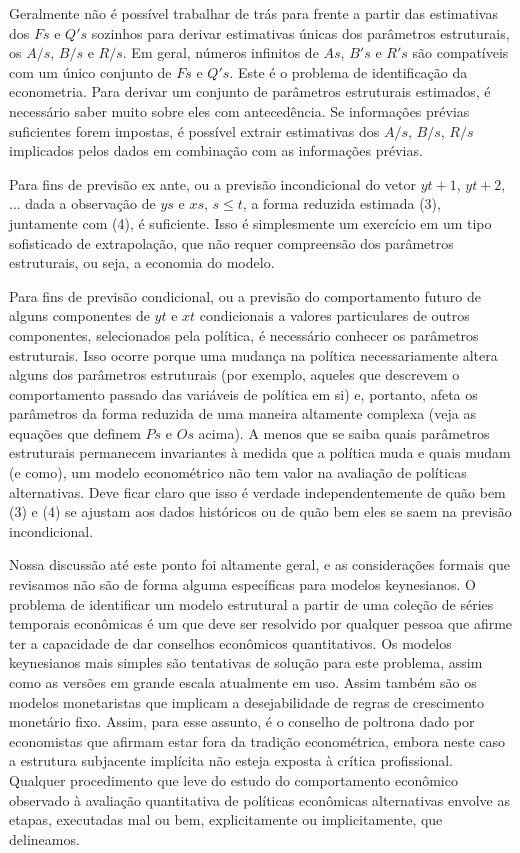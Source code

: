 \documentclass[a4paper,12pt]{article}[abntex2]
\begin{document}
Geralmente não é possível trabalhar de trás para frente a partir das estimativas dos $F s$ e $Q's$ sozinhos para derivar estimativas únicas dos parâmetros estruturais, os $A/s$, $B/s$ e $R/s$. Em geral, números infinitos de $As$, $B's$ e $R's$ são compatíveis com um único conjunto de $Fs$ e $Q's$. Este é o problema de identificação da econometria. Para derivar um conjunto de parâmetros estruturais estimados, é necessário saber muito sobre eles com antecedência. Se informações prévias suficientes forem impostas, é possível extrair estimativas dos $A/s$, $B/s$, $R/s$ implicados pelos dados em combinação com as informações prévias.

Para fins de previsão ex ante, ou a previsão incondicional do vetor $yt+1$, $yt+2$, ... dada a observação de $ys$ e $xs$, $s \leq t$, a forma reduzida estimada (3), juntamente com (4), é suficiente. Isso é simplesmente um exercício em um tipo sofisticado de extrapolação, que não requer compreensão dos parâmetros estruturais, ou seja, a economia do modelo.

Para fins de previsão condicional, ou a previsão do comportamento futuro de alguns componentes de $yt$ e $xt$ condicionais a valores particulares de outros componentes, selecionados pela política, é necessário conhecer os parâmetros estruturais. Isso ocorre porque uma mudança na política necessariamente altera alguns dos parâmetros estruturais (por exemplo, aqueles que descrevem o comportamento passado das variáveis de política em si) e, portanto, afeta os parâmetros da forma reduzida de uma maneira altamente complexa (veja as equações que definem $Ps$ e $Os$ acima). A menos que se saiba quais parâmetros estruturais permanecem invariantes à medida que a política muda e quais mudam (e como), um modelo econométrico não tem valor na avaliação de políticas alternativas. Deve ficar claro que isso é verdade independentemente de quão bem (3) e (4) se ajustam aos dados históricos ou de quão bem eles se saem na previsão incondicional.

Nossa discussão até este ponto foi altamente geral, e as considerações formais que revisamos não são de forma alguma específicas para modelos keynesianos. O problema de identificar um modelo estrutural a partir de uma coleção de séries temporais econômicas é um que deve ser resolvido por qualquer pessoa que afirme ter a capacidade de dar conselhos econômicos quantitativos. Os modelos keynesianos mais simples são tentativas de solução para este problema, assim como as versões em grande escala atualmente em uso. Assim também são os modelos monetaristas que implicam a desejabilidade de regras de crescimento monetário fixo. Assim, para esse assunto, é o conselho de poltrona dado por economistas que afirmam estar fora da tradição econométrica, embora neste caso a estrutura subjacente implícita não esteja exposta à crítica profissional. Qualquer procedimento que leve do estudo do comportamento econômico observado à avaliação quantitativa de políticas econômicas alternativas envolve as etapas, executadas mal ou bem, explicitamente ou implicitamente, que delineamos.
\end{document}
